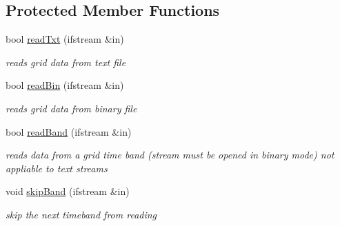\subsection*{Protected Member Functions}
\begin{DoxyCompactItemize}
\item 
bool \hyperlink{classfwi_1_1grid_1_1Grid_ac6262b427ff75bcfac1d118afccb1c71}{read\-Txt} (ifstream \&in)
\begin{DoxyCompactList}\small\item\em reads grid data from text file \end{DoxyCompactList}\item 
bool \hyperlink{classfwi_1_1grid_1_1Grid_a9f941bf44e6f27620181cd7b406150e2}{read\-Bin} (ifstream \&in)
\begin{DoxyCompactList}\small\item\em reads grid data from binary file \end{DoxyCompactList}\item 
bool \hyperlink{classfwi_1_1grid_1_1Grid_a07cf7c55e15a35e7b258574a8cda7685}{read\-Band} (ifstream \&in)
\begin{DoxyCompactList}\small\item\em reads data from a grid time band (stream must be opened in binary mode) not appliable to text streams \end{DoxyCompactList}\item 
void \hyperlink{classfwi_1_1grid_1_1Grid_a4b7534ee12c05e1a492da8de36cc0751}{skip\-Band} (ifstream \&in)
\begin{DoxyCompactList}\small\item\em skip the next timeband from reading \end{DoxyCompactList}\end{DoxyCompactItemize}
